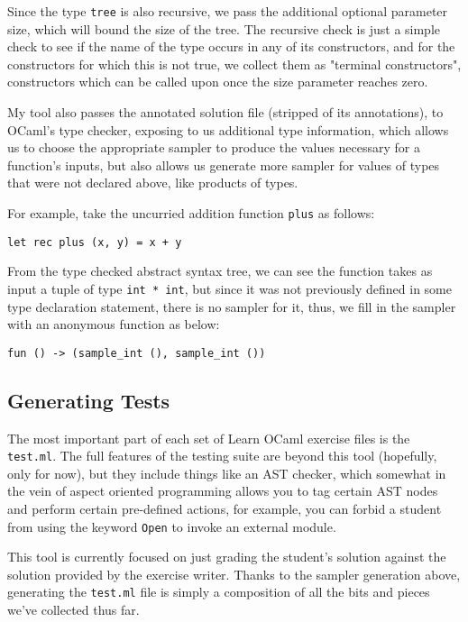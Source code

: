\documentclass[11pt]{article}
\begin{document}
Since the type \verb+tree+ is also recursive, we pass the additional optional parameter size, which will bound the size of the tree. The recursive check is just a simple check to see if the name of the type occurs in any of its constructors, and for the constructors for which this is not true, we collect them as "terminal constructors", constructors which can be called upon once the size parameter reaches zero.

My tool also passes the annotated solution file (stripped of its annotations), to OCaml's type checker, exposing to us additional type information, which allows us to choose the appropriate sampler to produce the values necessary for a function's inputs, but also allows us generate more sampler for values of types that were not declared above, like products of types.

For example, take the uncurried addition function \verb+plus+ as follows:
\begin{lstlisting}
let rec plus (x, y) = x + y
\end{lstlisting}

From the type checked abstract syntax tree, we can see the function takes as input a tuple of type \verb+int * int+, but since it was not previously defined in some type declaration statement, there is no sampler for it, thus, we fill in the sampler with an anonymous function as below:

\begin{lstlisting}
fun () -> (sample_int (), sample_int ())
\end{lstlisting}

\subsection{Generating Tests}
The most important part of each set of Learn OCaml exercise files is the \verb+test.ml+. The full features of the testing suite are beyond this tool (hopefully, only for now), but they include things like an AST checker, which somewhat in the vein of aspect oriented programming allows you to tag certain AST nodes and perform certain pre-defined actions, for example, you can forbid a student from using the keyword \verb+Open+ to invoke an external module.

This tool is currently focused on just grading the student's solution against the solution provided by the exercise writer. Thanks to the sampler generation above, generating the \verb+test.ml+ file is simply a composition of all the bits and pieces we've collected thus far.
\end{document}
